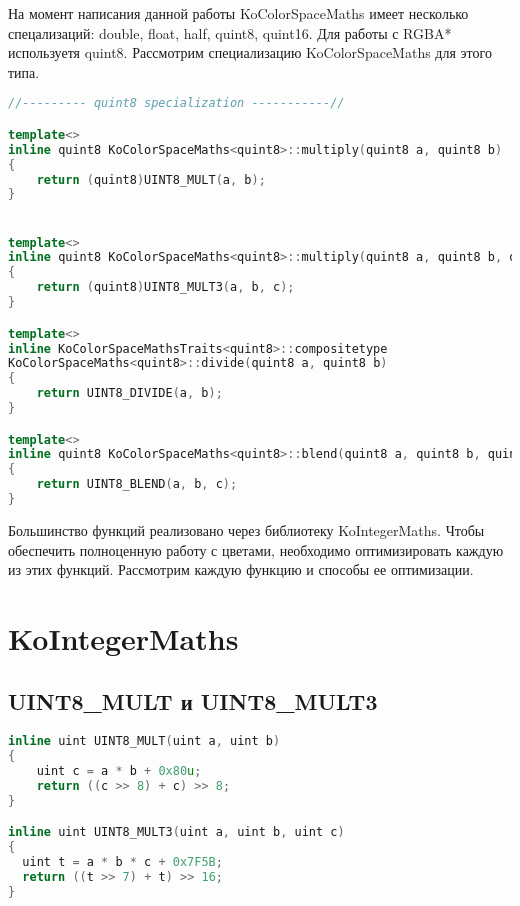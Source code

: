На момент написания данной работы KoColorSpaceMaths имеет несколько спецализаций: double, float, half, quint8, quint16. Для работы с RGBA* используетя quint8. Рассмотрим специализацию KoColorSpaceMaths для этого типа.
\newpage
{}
\begin{lstlisting}[language=c++]
//--------- quint8 specialization -----------//

template<>
inline quint8 KoColorSpaceMaths<quint8>::multiply(quint8 a, quint8 b)
{
    return (quint8)UINT8_MULT(a, b);
}


template<>
inline quint8 KoColorSpaceMaths<quint8>::multiply(quint8 a, quint8 b, quint8 c)
{
    return (quint8)UINT8_MULT3(a, b, c);
}

template<>
inline KoColorSpaceMathsTraits<quint8>::compositetype
KoColorSpaceMaths<quint8>::divide(quint8 a, quint8 b)
{
    return UINT8_DIVIDE(a, b);
}

template<>
inline quint8 KoColorSpaceMaths<quint8>::blend(quint8 a, quint8 b, quint8 c)
{
    return UINT8_BLEND(a, b, c);
}
\end{lstlisting}

Большинство функций реализовано через библиотеку KoIntegerMaths.
Чтобы обеспечить полноценную работу с цветами, необходимо оптимизировать каждую из этих функций.
Рассмотрим каждую функцию и способы ее оптимизации.

\newpage

\section{KoIntegerMaths}



\subsection{UINT8\_MULT и UINT8\_MULT3}
\begin{lstlisting}[language=c++]
inline uint UINT8_MULT(uint a, uint b)
{
    uint c = a * b + 0x80u;
    return ((c >> 8) + c) >> 8;
}

inline uint UINT8_MULT3(uint a, uint b, uint c)
{
  uint t = a * b * c + 0x7F5B;
  return ((t >> 7) + t) >> 16;
}
\end{lstlisting}

